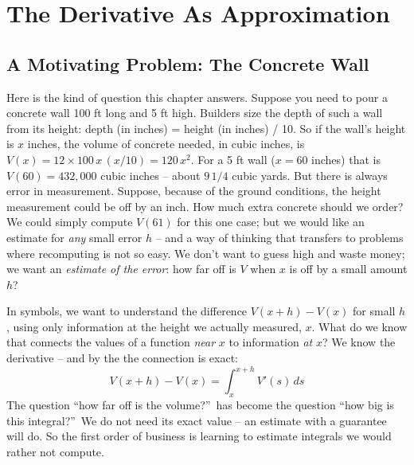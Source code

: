 %
%

\chapter{The Derivative As Approximation}

\section{A Motivating Problem: The Concrete Wall}
Here is the kind of question this chapter answers. Suppose you need to pour
a concrete wall 100 ft long and 5 ft high. Builders size the depth of such a
wall from its height: depth (in inches) = height (in inches) / 10. So if the
wall's height is $x$ inches, the volume of concrete needed, in cubic inches,
is $V(x) = 12 \times 100 \, x \, (x/10) = 120\, x^2$. For a 5 ft wall
($x = 60$ inches) that is $V(60) = 432{,}000$ cubic inches -- about
$9\,1/4$ cubic yards. But there is always error in measurement. Suppose,
because of the ground conditions, the height measurement could be off by an
inch. How much extra concrete should we order? We could simply compute
$V(61)$ for this one case; but we would like an estimate for {\it any\/}
small error $h$ -- and a way of thinking that transfers to problems where
recomputing is not so easy. We don't want to guess high and waste money; we
want an {\it estimate of the error\/}: how far off is $V$ when $x$ is off by
a small amount $h$?

In symbols, we want to understand the difference $V(x+h) - V(x)$ for small
$h$, using only information at the height we actually measured, $x$. What do
we know that connects the values of a function {\it near\/} $x$ to
information {\it at\/} $x$? We know the derivative -- and by the
 the connection is exact:
$$
V(x + h) - V(x) = \int_x^{x+h} V'(s) \, ds
$$
The question ``how far off is the volume?''\ has become the question ``how
big is this integral?''\ We do not need its exact value -- an estimate with
a guarantee will do. So the first order of business is learning to estimate
integrals we would rather not compute.

